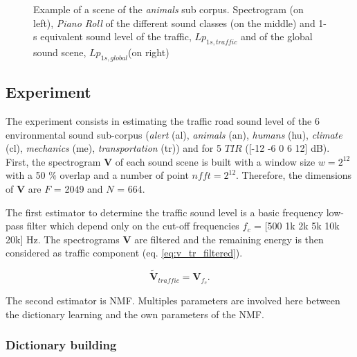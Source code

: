 \documentclass[twocolumn,a4paper,10pt]{article}
\begin{document}
\begin{figure}
\begin{minipage}[c]{.32\linewidth}
   \end{minipage}
\caption{Example of a scene of the \textit{animals} sub corpus. Spectrogram (on left), \textit{Piano Roll} of the different sound classes (on the middle) and 1-s equivalent sound level of the traffic, $Lp_{1s,traffic}$ and of the global sound scene, $Lp_{1s,global}$(on right)}
\label{fig:exampleScene}
\end{figure}

\subsection{Experiment}

The experiment consists in estimating the traffic road sound level of the 6 environmental sound sub-corpus (\textit{alert} (al), \textit{animals} (an), \textit{humans} (hu), \textit{climate} (cl), \textit{mechanics} (me), \textit{transportation} (tr)) and for 5 $TIR$ ([-12 -6 0 6 12] dB). First, the spectrogram $\mathbf{V}$ of each sound scene is built with a window size $w = 2^{12}$ with a 50 $\%$ overlap and a number of point $nfft = 2^{12}$. Therefore, the dimensions of $\mathbf{V}$ are $F$ = 2049 and $N$ = 664. 

The first estimator to determine the traffic sound level is a basic frequency low-pass filter which depend only on the cut-off frequencies $f_c$ = [500 1k 2k 5k 10k 20k] Hz. The spectrograms $\mathbf{V}$ are filtered and the remaining energy is then considered as traffic component (eq. \ref{eq:v_tr_filtered}). 

\begin{equation}\label{eq:v_tr_filtered}
\mathbf{\tilde{V}}_{traffic} = \mathbf{V}_{f_c}.
\end{equation}

The second estimator is NMF. Multiples parameters are involved here between the dictionary learning and the own parameters of the NMF. 

\subsubsection{Dictionary building}\label{part:dictionary_learning}
\end{document}
